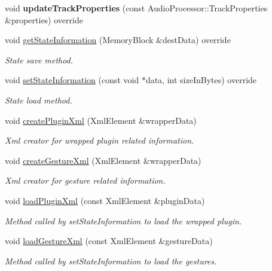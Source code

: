 \begin{DoxyCompactItemize}
void {\bfseries update\+Track\+Properties} (const Audio\+Processor\+::\+Track\+Properties \&properties) override
\item 
void \mbox{\hyperlink{class_plume_processor_ae06dd312c3dc3ba7389ce44fd74cbc18}{get\+State\+Information}} (Memory\+Block \&dest\+Data) override
\begin{DoxyCompactList}\small\item\em State save method. \end{DoxyCompactList}\item 
void \mbox{\hyperlink{class_plume_processor_aa7ab9da73c37f6db69ea6c7e1e4a0211}{set\+State\+Information}} (const void $\ast$data, int size\+In\+Bytes) override
\begin{DoxyCompactList}\small\item\em State load method. \end{DoxyCompactList}\item 
void \mbox{\hyperlink{class_plume_processor_ad29b07ddcd526e44529e361374c8c99e}{create\+Plugin\+Xml}} (Xml\+Element \&wrapper\+Data)
\begin{DoxyCompactList}\small\item\em Xml creator for wrapped plugin related information. \end{DoxyCompactList}\item 
void \mbox{\hyperlink{class_plume_processor_a14455799e2ddefd50b860d4492845509}{create\+Gesture\+Xml}} (Xml\+Element \&wrapper\+Data)
\begin{DoxyCompactList}\small\item\em Xml creator for gesture related information. \end{DoxyCompactList}\item 
void \mbox{\hyperlink{class_plume_processor_a08587fb2663557a8250132502785205c}{load\+Plugin\+Xml}} (const Xml\+Element \&plugin\+Data)
\begin{DoxyCompactList}\small\item\em Method called by set\+State\+Information to load the wrapped plugin. \end{DoxyCompactList}\item 
void \mbox{\hyperlink{class_plume_processor_a988e2a3ce47486bd8dfc5d5702420a7e}{load\+Gesture\+Xml}} (const Xml\+Element \&gesture\+Data)
\begin{DoxyCompactList}\small\item\em Method called by set\+State\+Information to load the gestures. \end{DoxyCompactList}\item 

\end{DoxyCompactItemize}
